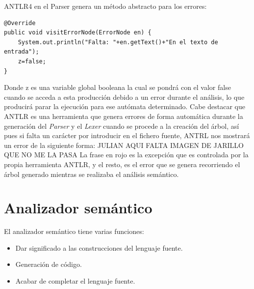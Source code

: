 \documentclass[12pt,a4paper]{article}
\begin{document}
ANTLR4 en el Parser genera un método abstracto para los errores:
\begin{lstlisting}
@Override
public void visitErrorNode(ErrorNode en) {
	System.out.println("Falta: "+en.getText()+"En el texto de entrada");
	z=false;
}
\end{lstlisting}
Donde z es una variable global booleana la cual se pondrá con el valor false cuando se acceda a
esta producción debido a un error durante el análisis, lo que producirá parar la ejecución para ese autómata determinado. \newline \newline
Cabe destacar que ANTLR es una herramienta que genera errores de forma automática durante
la generación del \textit{Parser} y el \textit{Lexer} cuando se procede a la creación del árbol, así pues si falta un carácter por introducir en el fichero fuente, ANTRL nos mostrará un error de la siguiente forma:
JULIAN AQUI FALTA IMAGEN DE JARILLO QUE NO ME LA PASA
La frase en rojo es la excepción que es controlada por la propia herramienta ANTLR, y el resto,
es el error que se genera recorriendo el árbol generado mientras se realizaba el análisis
semántico.

\section{Analizador semántico}

El analizador semántico tiene varias funciones:

\begin{itemize}
	\item Dar significado a las construcciones del lenguaje fuente. 
	\item Generación de código.
	\item Acabar de completar el lenguaje fuente.
\end{itemize}
 
\end{document}

